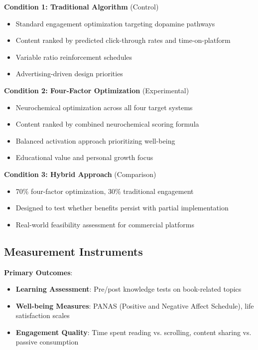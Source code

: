 \documentclass[11pt,letterpaper]{article}
\begin{document}
\textbf{Condition 1: Traditional Algorithm} (Control)
\begin{itemize}
    \item Standard engagement optimization targeting dopamine pathways
    \item Content ranked by predicted click-through rates and time-on-platform
    \item Variable ratio reinforcement schedules
    \item Advertising-driven design priorities
\end{itemize}

\textbf{Condition 2: Four-Factor Optimization} (Experimental)
\begin{itemize}
    \item Neurochemical optimization across all four target systems
    \item Content ranked by combined neurochemical scoring formula
    \item Balanced activation approach prioritizing well-being
    \item Educational value and personal growth focus
\end{itemize}

\textbf{Condition 3: Hybrid Approach} (Comparison)
\begin{itemize}
    \item 70\% four-factor optimization, 30\% traditional engagement
    \item Designed to test whether benefits persist with partial implementation
    \item Real-world feasibility assessment for commercial platforms
\end{itemize}

\subsection{Measurement Instruments}

\textbf{Primary Outcomes}:
\begin{itemize}
    \item \textbf{Learning Assessment}: Pre/post knowledge tests on book-related topics
    \item \textbf{Well-being Measures}: PANAS (Positive and Negative Affect Schedule), life satisfaction scales
    \item \textbf{Engagement Quality}: Time spent reading vs. scrolling, content sharing vs. passive consumption
\end{itemize}
\end{document}
